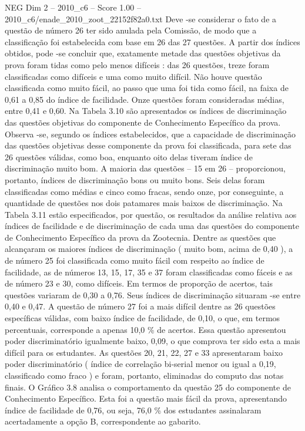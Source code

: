 \begin{textsample}{NEG Dim 2 – 2010\_c6 – Score 1.00 – 2010\_c6/enade\_2010\_zoot\_22152f82a0.txt}
Deve -se considerar o fato de a questão de número 26 ter sido anulada pela Comissão, de modo que a classificação foi estabelecida com base em 26 das 27 questões.
A partir dos índices obtidos, pode -se concluir que, exatamente metade das questões objetivas da prova foram tidas como pelo menos difíceis : das 26 questões, treze foram classificadas como difíceis e uma como muito difícil.
Não houve questão classificada como muito fácil, ao passo que uma foi tida como fácil, na faixa de 0,61 a 0,85 do índice de facilidade.
Onze questões foram consideradas médias, entre 0,41 e 0,60.
Na Tabela 3.10 são apresentados os índices de discriminação das questões objetivas do componente de Conhecimento Específico da prova.
Observa -se, segundo os índices estabelecidos, que a capacidade de discriminação das questões objetivas desse componente da prova foi classificada, para sete das 26 questões válidas, como boa, enquanto oito delas tiveram índice de discriminação muito bom.
A maioria das questões – 15 em 26 – proporcionou, portanto, índices de discriminação bons ou muito bons.
Seis delas foram classificadas como médias e cinco como fracas, sendo onze, por conseguinte, a quantidade de questões nos dois patamares mais baixos de discriminação.
Na Tabela 3.11 estão especificados, por questão, os resultados da análise relativa aos índices de facilidade e de discriminação de cada uma das questões do componente de Conhecimento Específico da prova da Zootecnia.
Dentre as questões que alcançaram os maiores índices de discriminação ( muito bom, acima de 0,40 ), a de número 25 foi classificada como muito fácil com respeito ao índice de facilidade, as de números 13, 15, 17, 35 e 37 foram classificadas como fáceis e as de número 23 e 30, como difíceis.
Em termos de proporção de acertos, tais questões variaram de 0,30 a 0,76.
Seus índices de discriminação situaram -se entre 0,40 e 0,47.
A questão de número 27 foi a mais difícil dentre as 26 questões específicas válidas, com baixo índice de facilidade, de 0,10, o que, em termos percentuais, corresponde a apenas 10,0 \% de acertos.
Essa questão apresentou poder discriminatório igualmente baixo, 0,09, o que comprova ter sido esta a mais difícil para os estudantes.
As questões 20, 21, 22, 27 e 33 apresentaram baixo poder discriminatório ( índice de correlação bi-serial menor ou igual a 0,19, classificado como fraco ) e foram, portanto, eliminadas do computo das notas finais.
O Gráfico 3.8 analisa o comportamento da questão 25 do componente de Conhecimento Específico.
Esta foi a questão mais fácil da prova, apresentando índice de facilidade de 0,76, ou seja, 76,0 \% dos estudantes assinalaram acertadamente a opção B, correspondente ao gabarito.

\end{textsample}
